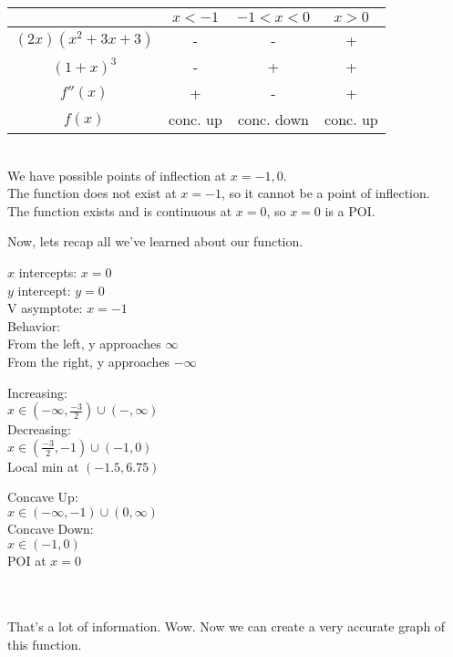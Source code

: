 \documentclass{letter}
\begin{document}
\begin{enumerate}[i)]
		\begin{tabular}{c|c|c|c}
			& $x<-1$ & $-1 < x < 0$ & $x > 0$\\
			\hline
			$(2x)(x^2 + 3x + 3)$ & - & - & +\\
			$(1+x)^3$ & - & + & +\\
			$f''(x)$ & + & - & +\\
			$f(x)$ & conc. up & conc. down & conc. up
		\end{tabular}\\
		
		We have possible points of inflection at $x= -1, 0$.\\
		The function does not exist at $x = -1$, so it cannot be a point of inflection.\\
		The function exists and is continuous at $x = 0$, so $x = 0$ is a POI.
	\end{enumerate}
	Now, lets recap all we've learned about our function.\\
	
	\begin{minipage}[t]{0.33\textwidth}
		$x$ intercepts: $x=0$\\
		$y$ intercept: $y=0$\\
		V asymptote: $x=-1$\\
		Behavior:\\
		From the left, y approaches $\infty$\\
		From the right, y approaches $-\infty$
	\end{minipage}
	\begin{minipage}[t]{0.33\textwidth}
		Increasing:\\
		$x \in (-\infty, \frac{-3}{2}) \cup (-, \infty)$\\
		Decreasing:\\
		$x \in (\frac{-3}{2}, -1) \cup (-1, 0)$\\
		Local min at $(-1.5, 6.75)$
	\end{minipage}
	\begin{minipage}[t]{0.33\textwidth}
		Concave Up:\\
		$x \in (-\infty, -1) \cup (0, \infty)$\\
		Concave Down:\\
		$x \in (-1, 0)$\\
		POI at $x=0$
	\end{minipage}\\
	\pagebreak\\
	That's a lot of information. Wow. Now we can create a very accurate graph of this function. 
	
\end{document}
